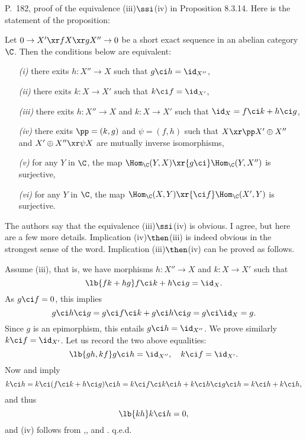 \documentclass[12pt]{article}
\theoremstyle{remark}
\theoremstyle{definition}
\begin{document}
\begin{s} 
P.~182, proof of the equivalence (iii)$\ssi$(iv) in Proposition 8.3.14. Here is the statement of the proposition:

\begin{prop}[Proposition 8.3.14 p. 182] 
Let $0\to X'\xr fX\xr gX''\to0$ be a short exact sequence in an abelian category $\C$. Then the conditions below are equivalent:
\begin{itemize}
\item[\em(i)] there exits $h:X''\to X$ such that $g\ci h=\id_{X''}$,
\item[\em(ii)] there exits $k:X\to X'$ such that $k\ci f=\id_{X'}$,
\item[\em(iii)] there exits $h:X''\to X$ and $k:X\to X'$ such that $\id_X=f\ci k+h\ci g$,
\item[\em(iv)] there exits $\pp=(k,g)$ and $\psi=(f,h)$ such that $X\xr\pp X'\oplus X''$ and $X'\oplus X''\xr\psi X$ are mutually inverse isomorphisms,
\item[\em(v)] for any $Y$ in $\C$, the map $\Hom_\C(Y,X)\xr{g\ci}\Hom_\C(Y,X'')$ is surjective,
\item[\em(vi)] for any $Y$ in $\C$, the map $\Hom_\C(X,Y)\xr{\ci f}\Hom_\C(X',Y)$ is surjective.
\end{itemize}
\end{prop}

The authors say that the equivalence (iii)$\ssi$(iv) is obvious. I agree, but here are a few more details. Implication (iv)$\then$(iii) is indeed obvious in the strongest sense of the word. Implication (iii)$\then$(iv) can be proved as follows. 

Assume (iii), that is, we have morphisms $h:X''\to X$ and $k:X\to X'$ such that 
%
\begin{equation}\lb{fk+hg} 
f\ci k+h\ci g=\id_X.
\end{equation} 
% 
As $g\ci f=0$, this implies 
$$
g\ci h\ci g=g\ci f\ci k+g\ci h\ci g=g\ci\id_X=g. 
$$ 
Since $g$ is an epimorphism, this entails $g\ci h=\id_{X''}$. We prove similarly $k\ci f=\id_{X'}$. Let us record the two above equalities: 
% 
\begin{equation}\lb{gh,kf} 
g\ci h=\id_{X''},\quad k\ci f=\id_{X'}.
\end{equation} 
% 
Now  and  imply 
$$
k\ci h=k\ci(f\ci k+h\ci g)\ci h=k\ci f\ci k\ci h+k\ci h\ci g\ci h=k\ci h+k\ci h,
$$ 
and thus 
%
\begin{equation}\lb{kh} 
k\ci h=0, 
\end{equation} 
% 
and (iv) follows from ,, and . q.e.d.
\end{s}
\end{document}
